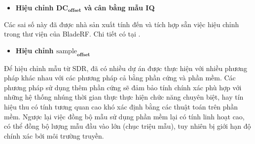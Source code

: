 {%

\begin{itemize}
	\item \textbf{Hiệu chỉnh $\textbf{DC}_{\textbf{offset}}$ và cân bằng  mẫu IQ}
\end{itemize}

Các sai số này đã được nhà sản xuất tính đến và tích hợp sẵn việc hiệu chỉnh trong thư viện của BladeRF. Chi tiết có tại \cite{Dccali}.

\begin{itemize}
	\item \textbf{Hiệu chỉnh $\textrm{sample}_{\textbf{offset}}$}
\end{itemize} 

Để hiệu chỉnh mẫu từ SDR, đã có nhiều dự án được thực hiện với nhiều phương pháp khác nhau với các phương pháp cả bằng phần cứng và phần mềm. Các phương pháp sử dụng thêm phần cứng sẽ đảm bảo tính chính xác phù hợp với những hệ thống nhúng thời gian thực thực hiện chức năng chuyên biệt, hay tín hiệu thu có tính tương quan cao khó xác định bằng các thuật toán trên phần mềm. Ngược lại việc đồng bộ mẫu sử dụng phần mềm lại có tính linh hoạt cao, có thể đồng bộ lượng mẫu đầu vào lớn (chục triệu mẫu), tuy nhiên bị giới hạn độ chính xác bởi môi trường truyền.

}
